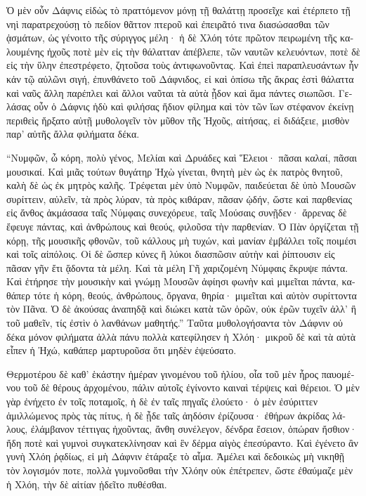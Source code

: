 \documentclass{book}
\begin{document}
\begin{pairs}
\begin{Leftside}
\begin{greek}
  Ὁ μὲν οὖν Δάφνις εἰδὼς τὸ πραττόμενον μόνῃ τῇ θαλάττῃ προσεῖχε καὶ ἐτέρπετο τῇ νηὶ παρατρεχούσῃ τὸ πεδίον θᾶττον πτεροῦ καὶ ἐπειρᾶτό τινα διασώσασθαι τῶν ᾀσμάτων, ὡς γένοιτο τῆς σύριγγος μέλη·  ἡ δὲ Χλόη τότε πρῶτον πειρωμένη τῆς καλουμένης ἠχοῦς ποτὲ μὲν εἰς τὴν θάλατταν ἀπέβλεπε, τῶν ναυτῶν κελευόντων, ποτὲ δὲ εἰς τὴν ὕλην ἐπεστρέφετο,  ζητοῦσα τοὺς ἀντιφωνοῦντας. Καὶ ἐπεὶ παραπλευσάντων ἦν κἀν τῷ αὐλῶνι σιγή, ἐπυνθάνετο τοῦ Δάφνιδος, εἰ καὶ ὀπίσω τῆς ἄκρας ἐστὶ θάλαττα καὶ ναῦς ἄλλη παρέπλει καὶ ἄλλοι ναῦται τὰ αὐτὰ ᾖδον καὶ ἅμα πάντες σιωπῶσι.  Γελάσας οὖν ὁ Δάφνις ἡδὺ καὶ φιλήσας ἥδιον φίλημα καὶ τὸν τῶν ἴων στέφανον ἐκείνῃ περιθεὶς ἤρξατο αὐτῇ μυθολογεῖν τὸν μῦθον τῆς Ἠχοῦς, αἰτήσας, εἰ διδάξειε, μισθὸν παρ’ αὐτῆς ἄλλα φιλήματα δέκα.
\pend


  “Νυμφῶν, ὦ κόρη, πολὺ γένος, Μελίαι καὶ Δρυάδες καὶ Ἕλειοι· πᾶσαι καλαί, πᾶσαι μουσικαί. Καὶ μιᾶς τούτων θυγάτηρ Ἠχὼ γίνεται, θνητὴ μὲν ὡς ἐκ πατρὸς θνητοῦ, καλὴ δὲ ὡς ἐκ μητρὸς καλῆς.  Τρέφεται μὲν ὑπὸ Νυμφῶν, παιδεύεται δὲ ὑπὸ Μουσῶν συρίττειν, αὐλεῖν, τὰ πρὸς λύραν, τὰ πρὸς κιθάραν, πᾶσαν ᾠδήν, ὥστε καὶ παρθενίας εἰς ἄνθος ἀκμάσασα ταῖς Νύμφαις συνεχόρευε, ταῖς Μούσαις συνῇδεν· ἄρρενας δὲ ἔφευγε πάντας, καὶ ἀνθρώπους καὶ θεούς, φιλοῦσα τὴν παρθενίαν.  Ὁ Πὰν ὀργίζεται τῇ κόρῃ, τῆς μουσικῆς φθονῶν, τοῦ κάλλους μὴ τυχών, καὶ μανίαν ἐμβάλλει τοῖς ποιμέσι καὶ τοῖς αἰπόλοις. Οἱ δὲ ὥσπερ κύνες ἢ λύκοι διασπῶσιν αὐτὴν καὶ ῥίπτουσιν εἰς πᾶσαν γῆν ἔτι ᾅδοντα τὰ μέλη.  Καὶ τὰ μέλη Γῆ χαριζομένη Νύμφαις ἔκρυψε πάντα. Καὶ ἐτήρησε τὴν μουσικὴν καὶ γνώμῃ Μουσῶν ἀφίησι φωνὴν καὶ μιμεῖται πάντα, καθάπερ τότε ἡ κόρη, θεούς, ἀνθρώπους, ὄργανα, θηρία· μιμεῖται καὶ αὐτὸν συρίττοντα τὸν Πᾶνα.  Ὁ δὲ ἀκούσας ἀναπηδᾷ καὶ διώκει κατὰ τῶν ὀρῶν, οὐκ ἐρῶν τυχεῖν ἀλλ’ ἢ τοῦ μαθεῖν, τίς ἐστὶν ὁ λανθάνων μαθητής.” Ταῦτα μυθολογήσαντα τὸν Δάφνιν οὐ δέκα μόνον φιλήματα ἀλλὰ πάνυ πολλὰ κατεφίλησεν ἡ Χλόη· μικροῦ δὲ καὶ τὰ αὐτὰ εἶπεν ἡ Ἠχώ, καθάπερ μαρτυροῦσα ὅτι μηδὲν ἐψεύσατο.
\pend


  Θερμοτέρου δὲ καθ’ ἑκάστην ἡμέραν γινομένου τοῦ ἡλίου, οἷα τοῦ μὲν ἦρος παυομένου τοῦ δὲ θέρους ἀρχομένου, πάλιν αὐτοῖς ἐγίνοντο καιναὶ τέρψεις καὶ θέρειοι.  Ὁ μὲν γὰρ ἐνήχετο ἐν τοῖς ποταμοῖς, ἡ δὲ ἐν ταῖς πηγαῖς ἐλούετο· ὁ μὲν ἐσύριττεν ἁμιλλώμενος πρὸς τὰς πίτυς, ἡ δὲ ᾖδε ταῖς ἀηδόσιν ἐρίζουσα· ἐθήρων ἀκρίδας λάλους, ἐλάμβανον τέττιγας ἠχοῦντας, ἄνθη συνέλεγον, δένδρα ἔσειον, ὀπώραν ἤσθιον· ἤδη ποτὲ καὶ γυμνοὶ συγκατεκλίνησαν καὶ ἓν δέρμα αἰγὸς ἐπεσύραντο.  Καὶ ἐγένετο ἂν γυνὴ Χλόη ῥᾳδίως, εἰ μὴ Δάφνιν ἐτάραξε τὸ αἷμα. Ἀμέλει καὶ δεδοικὼς μὴ νικηθῇ τὸν λογισμόν ποτε, πολλὰ γυμνοῦσθαι τὴν Χλόην οὐκ ἐπέτρεπεν, ὥστε ἐθαύμαζε μὲν ἡ Χλόη, τὴν δὲ αἰτίαν ᾐδεῖτο πυθέσθαι.
\pend



\end{greek}
\end{Leftside}
\end{pairs}
\end{document}
